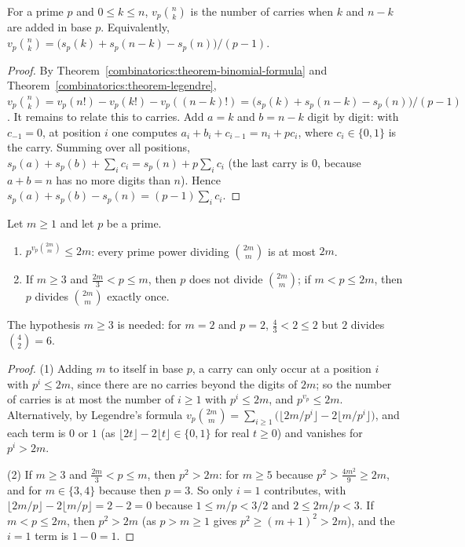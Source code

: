 \begin{theorem}[Kummer]\label{combinatorics:theorem-kummer}
For a prime $p$ and $0 \leq k \leq n$, $v_p\binom{n}{k}$ is the number of carries when $k$ and $n - k$ are added in base $p$. Equivalently, $v_p\binom{n}{k} = \bigl(s_p(k) + s_p(n - k) - s_p(n)\bigr)/(p - 1)$.
\end{theorem}

\begin{proof}
By Theorem~\ref{combinatorics:theorem-binomial-formula} and Theorem~\ref{combinatorics:theorem-legendre},
$v_p\binom{n}{k} = v_p(n!) - v_p(k!) - v_p((n - k)!) = \bigl(s_p(k) + s_p(n - k) - s_p(n)\bigr)/(p - 1)$. It remains to relate this to carries. Add $a = k$ and $b = n - k$ digit by digit: with
$c_{-1} = 0$, at position $i$ one computes $a_i + b_i + c_{i-1} = n_i + pc_i$, where $c_i \in \{0, 1\}$ is the carry. Summing over all positions, $s_p(a) + s_p(b) + \sum_ic_{i} = s_p(n) + p\sum_ic_i$
(the last carry is $0$, because $a + b = n$ has no more digits than $n$). Hence $s_p(a) + s_p(b) - s_p(n) = (p - 1)\sum_ic_i$.
\end{proof}

\begin{corollary}\label{combinatorics:corollary-central-binomial-primes}
Let $m \geq 1$ and let $p$ be a prime.
\begin{enumerate}
\item $p^{v_p\binom{2m}{m}} \leq 2m$: every prime power dividing $\binom{2m}{m}$ is at most $2m$.
\item If $m \geq 3$ and $\frac{2m}{3} < p \leq m$, then $p$ does not divide $\binom{2m}{m}$; if $m < p \leq 2m$, then $p$ divides $\binom{2m}{m}$ exactly once.
\end{enumerate}
The hypothesis $m \geq 3$ is needed: for $m = 2$ and $p = 2$, $\frac43 < 2 \leq 2$ but $2$ divides $\binom{4}{2} = 6$.
\end{corollary}

\begin{proof}
(1) Adding $m$ to itself in base $p$, a carry can only occur at a position $i$ with $p^i \leq 2m$, since there are no carries beyond the digits of $2m$; so the number of carries is at most the number of
$i \geq 1$ with $p^i \leq 2m$, and $p^{v_p} \leq 2m$. Alternatively, by Legendre's formula $v_p\binom{2m}{m} = \sum_{i \geq 1}\bigl(\lfloor 2m/p^i \rfloor - 2\lfloor m/p^i \rfloor\bigr)$, and each term is
$0$ or $1$ (as $\lfloor 2t \rfloor - 2\lfloor t \rfloor \in \{0, 1\}$ for real $t \geq 0$) and vanishes for $p^i > 2m$.

(2) If $m \geq 3$ and $\frac{2m}{3} < p \leq m$, then $p^2 > 2m$: for $m \geq 5$ because $p^2 > \frac{4m^2}{9} \geq 2m$, and for $m \in \{3, 4\}$ because then $p = 3$. So only $i = 1$ contributes, with
$\lfloor 2m/p \rfloor - 2\lfloor m/p \rfloor = 2 - 2 = 0$ because $1 \leq m/p < 3/2$ and $2 \leq 2m/p < 3$. If $m < p \leq 2m$, then $p^2 > 2m$ (as $p > m \geq 1$ gives $p^2 \geq (m + 1)^2 > 2m$), and the
$i = 1$ term is $1 - 0 = 1$.
\end{proof}

